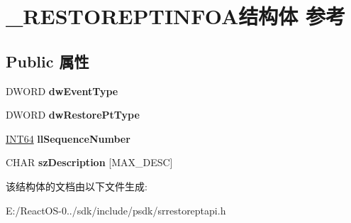 \hypertarget{struct___r_e_s_t_o_r_e_p_t_i_n_f_o_a}{}\section{\+\_\+\+R\+E\+S\+T\+O\+R\+E\+P\+T\+I\+N\+F\+O\+A结构体 参考}
\label{struct___r_e_s_t_o_r_e_p_t_i_n_f_o_a}
\subsection*{Public 属性}
\begin{DoxyCompactItemize}
\item 
\mbox{\label{struct___r_e_s_t_o_r_e_p_t_i_n_f_o_a_a8473f4e09aba28b8e526cf9e816d3376}} 
D\+W\+O\+RD {\bfseries dw\+Event\+Type}
\item 
\mbox{\label{struct___r_e_s_t_o_r_e_p_t_i_n_f_o_a_a986c8fc502020bc484a9b910d702fc9f}} 
D\+W\+O\+RD {\bfseries dw\+Restore\+Pt\+Type}
\item 
\mbox{\label{struct___r_e_s_t_o_r_e_p_t_i_n_f_o_a_a9abedcb157cb64996667b360b52bfe78}} 
\hyperlink{_processor_bind_8h_af16992cf571ce4103a92355761cc471e}{I\+N\+T64} {\bfseries ll\+Sequence\+Number}
\item 
\mbox{\label{struct___r_e_s_t_o_r_e_p_t_i_n_f_o_a_a6f152ec9eb56fcbc555a3c4658f5a2e4}} 
C\+H\+AR {\bfseries sz\+Description} \mbox{[}M\+A\+X\+\_\+\+D\+E\+SC\mbox{]}
\end{DoxyCompactItemize}


该结构体的文档由以下文件生成\+:\begin{DoxyCompactItemize}
\item 
E\+:/\+React\+O\+S-\/0../sdk/include/psdk/srrestoreptapi.\+h\end{DoxyCompactItemize}
